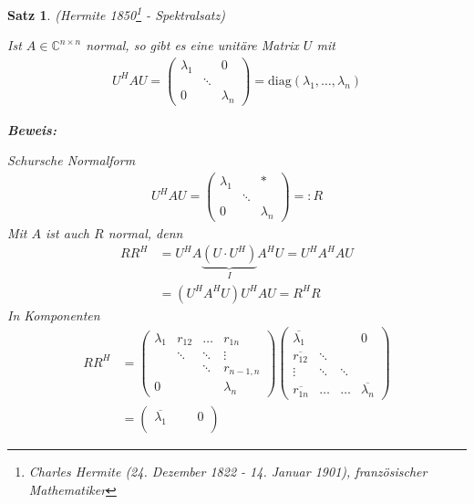 \documentclass[%
a4paper,
11pt,		%
]
{scrartcl}
\newcommand{\C}{\mathbb{C}}
\theoremstyle{plain}
\theoremstyle{plain}
\newtheorem{mysatz}[mydef]{Satz}
\theoremstyle{plain}
\theoremstyle{plain}
\begin{document}
\begin{mysatz} (Hermite 1850\footnote{Charles Hermite (24. Dezember 1822 - 14. Januar 1901), französischer Mathematiker} - \textit{Spektralsatz})

Ist $A \in \C^{n \times n}$ normal, so gibt es eine unitäre Matrix $U$ mit
\begin{align*}
U^H A U = 
\begin{pmatrix}
\lambda_1 & & 0\\
& \ddots & \\
0 & & \lambda_n
\end{pmatrix}
=
\text{diag}(\lambda_1,\dots,\lambda_n)
\end{align*}

\newpage

\textbf{Beweis:}

Schursche Normalform
\begin{align*}
U^H A U = 
\begin{pmatrix}
\lambda_1 & & *\\
& \ddots & \\
0 & & \lambda_n
\end{pmatrix}
=: R
\end{align*}
Mit $A$ ist auch $R$ normal, denn
\begin{align*}
RR^H & = U^H A \underbrace{(U \cdot U^H)}_{I} A^H U = U^H A^H A U\\
 & = (U^H A^H U) U^H A U  = R^H R
\end{align*}
In Komponenten
\begin{align*}
R R^H & = 
\begin{pmatrix}
\lambda_1   & r_{12}    & \dots     & r_{1n}\\
            & \ddots    & \ddots    & \vdots\\
            &           & \ddots    & r_{n-1,n}\\
0           &           &           & \lambda_n
\end{pmatrix}
\begin{pmatrix}
\overline{\lambda_1}    & & & 0\\
\overline{r_{12}}       & \ddots\\
\vdots                  & \ddots & \ddots\\
\overline{r_{1n}}       & \dots & \dots & \overline{\lambda_n}
\end{pmatrix}\\
& = 
\begin{pmatrix}
\overline{\lambda_1}    & & & 0\\

\end{pmatrix}
\end{align*}
\end{mysatz}
\end{document}
